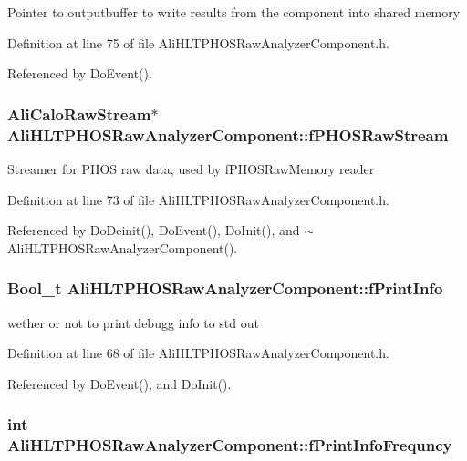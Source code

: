 Pointer to outputbuffer to write results from the component into shared memory 

Definition at line 75 of file Ali\-HLTPHOSRaw\-Analyzer\-Component.h.

Referenced by Do\-Event().
\subsubsection{\setlength{\rightskip}{0pt plus 5cm}Ali\-Calo\-Raw\-Stream$\ast$ {\bf Ali\-HLTPHOSRaw\-Analyzer\-Component::f\-PHOSRaw\-Stream}\hspace{0.3cm}{\tt  [private]}}\label{classAliHLTPHOSRawAnalyzerComponent_r11}


Streamer for PHOS raw data, used by f\-PHOSRaw\-Memory reader 

Definition at line 73 of file Ali\-HLTPHOSRaw\-Analyzer\-Component.h.

Referenced by Do\-Deinit(), Do\-Event(), Do\-Init(), and $\sim$Ali\-HLTPHOSRaw\-Analyzer\-Component().
\subsubsection{\setlength{\rightskip}{0pt plus 5cm}Bool\_\-t {\bf Ali\-HLTPHOSRaw\-Analyzer\-Component::f\-Print\-Info}\hspace{0.3cm}{\tt  [private]}}\label{classAliHLTPHOSRawAnalyzerComponent_r6}


wether or not to print debugg info to std out 

Definition at line 68 of file Ali\-HLTPHOSRaw\-Analyzer\-Component.h.

Referenced by Do\-Event(), and Do\-Init().
\subsubsection{\setlength{\rightskip}{0pt plus 5cm}int {\bf Ali\-HLTPHOSRaw\-Analyzer\-Component::f\-Print\-Info\-Frequncy}\hspace{0.3cm}{\tt  [private]}}\label{classAliHLTPHOSRawAnalyzerComponent_r10}


